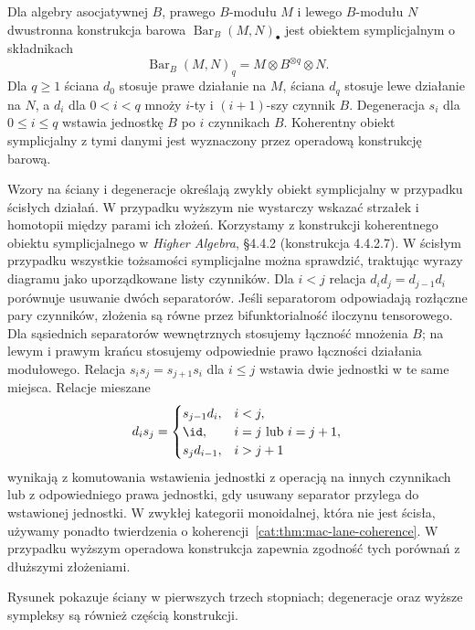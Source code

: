 \begin{definicja}\label{cat:def:infty-two-sided-bar}
Dla algebry asocjatywnej $B$, prawego $B$-modułu $M$ i lewego $B$-modułu $N$ dwustronna konstrukcja barowa $\operatorname{Bar}_B(M,N)_\bullet$ jest obiektem symplicjalnym o składnikach
\begin{equation}\label{cat:eq:infty-bar-terms}
 \operatorname{Bar}_B(M,N)_q=M\otimes B^{\otimes q}\otimes N.
\end{equation}
Dla $q\geq1$ ściana $d_0$ stosuje prawe działanie na $M$, ściana $d_q$ stosuje lewe działanie na $N$, a $d_i$ dla $0<i<q$ mnoży $i$-ty i $(i+1)$-szy czynnik $B$. Degeneracja $s_i$ dla $0\leq i\leq q$ wstawia jednostkę $B$ po $i$ czynnikach $B$. Koherentny obiekt symplicjalny z tymi danymi jest wyznaczony przez operadową konstrukcję barową.
\end{definicja}

Wzory na ściany i degeneracje określają zwykły obiekt symplicjalny w przypadku ścisłych działań. W przypadku wyższym nie wystarczy wskazać strzałek i homotopii między parami ich złożeń. Korzystamy z konstrukcji koherentnego obiektu symplicjalnego w \emph{Higher Algebra}, \S4.4.2 (konstrukcja 4.4.2.7). W ścisłym przypadku wszystkie tożsamości symplicjalne można sprawdzić, traktując wyrazy diagramu jako uporządkowane listy czynników. Dla $i<j$ relacja $d_i d_j=d_{j-1}d_i$ porównuje usuwanie dwóch separatorów. Jeśli separatorom odpowiadają rozłączne pary czynników, złożenia są równe przez bifunktorialność iloczynu tensorowego. Dla sąsiednich separatorów wewnętrznych stosujemy łączność mnożenia $B$; na lewym i prawym krańcu stosujemy odpowiednie prawo łączności działania modułowego. Relacja $s_i s_j=s_{j+1}s_i$ dla $i\leq j$ wstawia dwie jednostki w te same miejsca. Relacje mieszane
\[
 d_i s_j=
 \begin{cases}
 s_{j-1}d_i,&i<j,\\
 \id,&i=j\ \text{lub}\ i=j+1,\\
 s_j d_{i-1},&i>j+1
 \end{cases}
\]
wynikają z komutowania wstawienia jednostki z operacją na innych czynnikach lub z odpowiedniego prawa jednostki, gdy usuwany separator przylega do wstawionej jednostki. W zwykłej kategorii monoidalnej, która nie jest ścisła, używamy ponadto twierdzenia o koherencji~\ref{cat:thm:mac-lane-coherence}. W przypadku wyższym operadowa konstrukcja zapewnia zgodność tych porównań z dłuższymi złożeniami.

\begin{center}
\end{center}
Rysunek pokazuje ściany w pierwszych trzech stopniach; degeneracje oraz wyższe sympleksy są również częścią konstrukcji.

